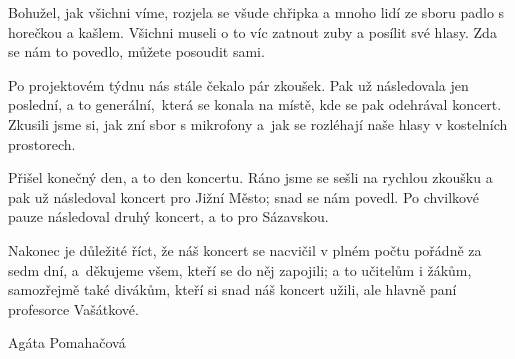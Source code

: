 \documentclass[12pt, a4paper]{article}
\begin{document}
\begin{multicols*}{2}
        Bohužel, jak všichni víme, rozjela se všude chřipka a mnoho lidí ze sboru padlo s horečkou a kašlem. Všichni museli o to víc zatnout zuby a posílit své hlasy. Zda se nám to povedlo, můžete posoudit sami.

        Po projektovém týdnu nás stále čekalo pár zkoušek. Pak už následovala jen poslední, a to generální,~která se konala na místě, kde se pak odehrával koncert. Zkusili jsme si, jak zní sbor s mikrofony a~jak se rozléhají naše hlasy v kostelních prostorech. 
        
        Přišel konečný den, a to den koncertu. Ráno jsme se sešli na rychlou zkoušku a pak už následoval koncert pro Jižní Město; snad se nám povedl. Po chvilkové pauze následoval druhý koncert, a to pro Sázavskou.

        Nakonec je důležité říct, že náš koncert se nacvičil v plném počtu pořádně za sedm dní, a~děkujeme všem, kteří se do něj zapojili; a to učitelům i žákům, samozřejmě také divákům, kteří si snad náš koncert užili, ale hlavně paní profesorce Vašátkové.

\begin{flushright}
    \footnotesize 
    Agáta Pomahačová
\end{flushright}

    \end{multicols*}
    \newpage
\end{document}
